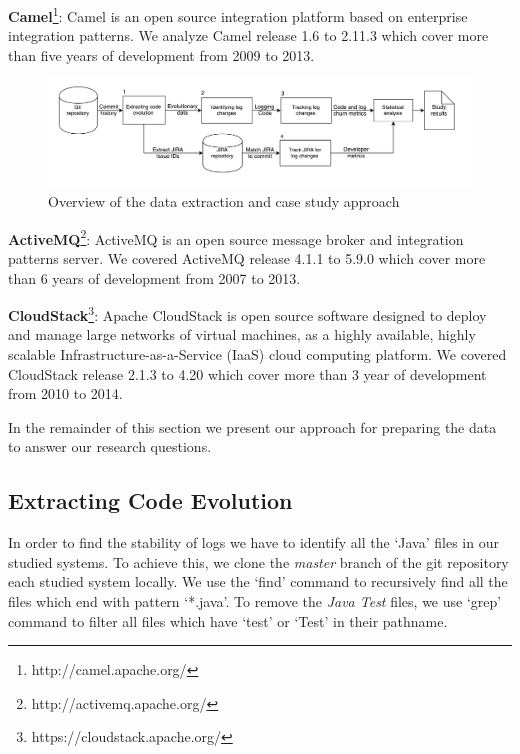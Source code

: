 

\textbf{Camel}\footnote[2]{http://camel.apache.org/}: Camel is an open source integration platform based on enterprise integration patterns. We analyze Camel release 1.6 to 2.11.3 which cover more than five years of development from 2009 to 2013. 
\begin{figure}[tb]
	\centering
	\includegraphics[width=1\linewidth,height=0.29\textwidth]{LogGenalogyMethdology}
	\caption{Overview of the data extraction and case study approach}
	\label{fig:LGmethod}
\end{figure}



\textbf{ActiveMQ}\footnote[3]{http://activemq.apache.org/}: ActiveMQ is an open source message broker and integration patterns server. We covered ActiveMQ release 4.1.1 to 5.9.0 which cover more than 6 years of development from 2007 to 2013.


\textbf{CloudStack}\footnote[4]{https://cloudstack.apache.org/}: Apache CloudStack is open source software designed to deploy and manage large networks of virtual machines, as a highly available, highly scalable Infrastructure-as-a-Service (IaaS) cloud computing platform. We covered CloudStack release 2.1.3 to 4.20 which cover more than 3 year of development from 2010 to 2014.

In the remainder of this section we present our approach for preparing the data to answer
our research questions.


\subsection{Extracting Code Evolution}
In order to find the stability of logs we have to identify all the `Java' files in our studied systems. To achieve this, we clone the \emph{master} branch of the git repository each studied system locally. We use the `find' command to recursively find all the files which end with pattern `*.java'. To remove the \textsl{Java Test} files, we use `grep' command to filter all files which have `test' or `Test' in their pathname.

